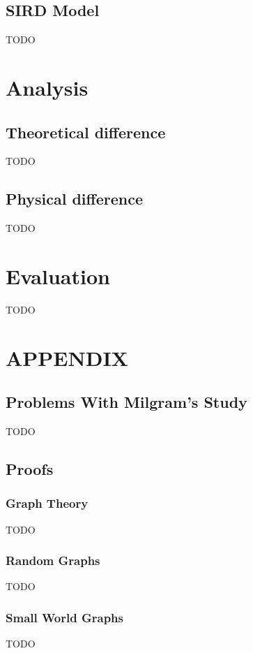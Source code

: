 \documentclass{article}
\begin{document}
        \subsection{SIRD Model}
        TODO
    \section{Analysis}
        \subsection{Theoretical difference}
        TODO
        \subsection{Physical difference}
        TODO
        
        
    \section{Evaluation}
    TODO
    \section{APPENDIX}
        \subsection{Problems With Milgram's Study}
        TODO
        \subsection{Proofs}
            \subsubsection{Graph Theory}
            TODO
            \subsubsection{Random Graphs}
            TODO
            \subsubsection{Small World Graphs}
            TODO
\end{document}
